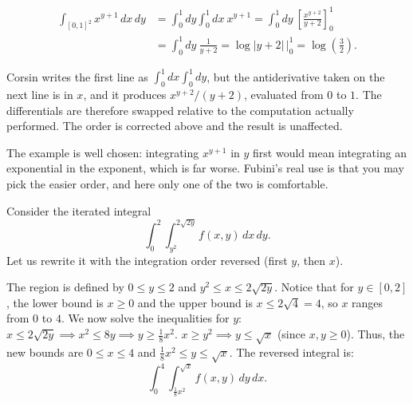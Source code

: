 \begin{example}
\label{ex:fubini_unit_square}
\[
\begin{aligned}
\int_{[0,1]^2} x^{y+1}\,dx\,dy
  &= \int_0^1 dy \int_0^1 dx\ x^{y+1}
   = \int_0^1 dy\ \left[\frac{x^{y+2}}{y+2}\right]_0^1 \\
  &= \int_0^1 dy\ \frac{1}{y+2}
   = \log|y+2|\,\Big|_0^1
   = \log\!\left(\tfrac32\right).
\end{aligned}
\]
\end{example}

\begin{ainote}
Corsin writes the first line as $\int_0^1 dx \int_0^1 dy$, but the antiderivative taken on the
next line is in $x$, and it produces $x^{y+2}/(y+2)$, evaluated from $0$ to $1$. The
differentials are therefore swapped relative to the computation actually performed. The order is corrected
above and the result is unaffected.

The example is well chosen: integrating $x^{y+1}$ in $y$ first would mean integrating an
exponential in the exponent, which is far worse. Fubini's real use is that you may pick the
easier order, and here only one of the two is comfortable.
\end{ainote}

\begin{example}
\label{ex:change_order_integration}
Consider the iterated integral
\[\int_0^2 \int_{y^2}^{2\sqrt{2y}} f(x,y) \,dx\,dy.\]
Let us rewrite it with the integration order reversed (first $y$, then $x$).

The region is defined by $0 \leq y \leq 2$ and $y^2 \leq x \leq 2\sqrt{2y}$.
Notice that for $y \in [0,2]$, the lower bound is $x \geq 0$ and the upper bound is $x \leq 2\sqrt{4} = 4$, so $x$ ranges from $0$ to $4$.
We now solve the inequalities for $y$:
$x \leq 2\sqrt{2y} \implies x^2 \leq 8y \implies y \geq \frac{1}{8}x^2$.
$x \geq y^2 \implies y \leq \sqrt{x}$ (since $x,y \geq 0$).
Thus, the new bounds are $0 \leq x \leq 4$ and $\frac{1}{8}x^2 \leq y \leq \sqrt{x}$. The reversed integral is:
\[\int_0^4 \int_{\frac{1}{8}x^2}^{\sqrt{x}} f(x,y) \,dy\,dx.\]
\end{example}

